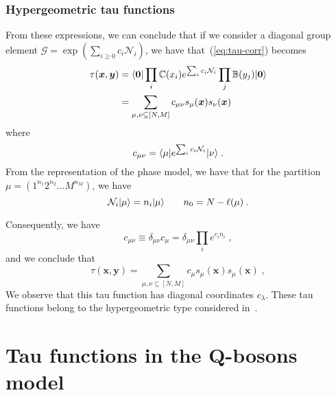 \documentclass[a4paper,11pt]{amsart}
\begin{document}

\subsubsection{Hypergeometric tau functions}
From these expressions, we can conclude that if we consider a diagonal
group element \(\mathcal{G} = \exp \left( \sum_{i\geq 0} c_i
\mathcal{N}_i\right)\), we have that~(\ref{eq:tau-corr}) becomes
\begin{equation}
\begin{split}
  \tau(\bm{x}, \bm{y}) 
  & = \langle\bm{0}\rvert \prod_{i} \mathbb{C}(x_i)
  e^{\sum_i c_i \mathcal{N}_i} \prod_j \mathbb{B}(y_j) \lvert\bm{0}\rangle\\
  & = \sum_{\mu, \nu \subseteq [N,M]} c_{\mu\nu} s_\mu(\bm{x}) s_\nu(\bm{x})
\end{split}
\end{equation}
where
\begin{equation}
  c_{\mu \nu} = \langle\mu\rvert e^{\sum_i c_i \mathcal{N}_i}\lvert\nu\rangle \; .
\end{equation}
From the representation of the phase model, we have that for the partition
\(\mu = (1^{n_1} 2^{n_2} \dots M^{n_M})\), we have
\begin{equation}
  \mathcal{N}_i \lvert\mu\rangle = n_i \lvert\mu\rangle \qquad n_0 = N - \ell(\mu)\; .
\end{equation}

Consequently, we have
\begin{equation}
  c_{\mu \nu} \equiv \delta_{\mu\nu} c_{\mu}  =  \delta_{\mu\nu} \prod_i e^{c_i n_i}\; , 
\end{equation}
and we conclude that 
\begin{equation}
  \tau(\bm{x}, \bm{y}) 
  = \sum_{\mu, \nu \subseteq [N,M]} c_{\mu} s_\mu(\bm{x}) s_\mu(\bm{x})\; ,
\end{equation}
We observe that this tau function has diagonal coordinates
\(c_\lambda\). These tau functions belong to the hypergeometric type
considered in~\cite{Orlov:2000, orlov:2001, Orlov:2001b, Orlov:2005}.








\section{Tau functions in the Q-bosons model}
\end{document}
